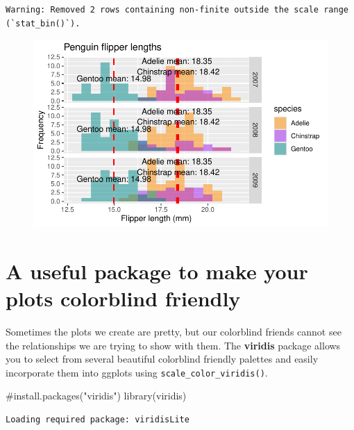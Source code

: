 \documentclass[
  letterpaper,
  DIV=11,
  numbers=noendperiod]{scrreprt}
\newenvironment{Shaded}{\begin{snugshade}}{\end{snugshade}}
\newcommand{\CommentTok}[1]{\textcolor[rgb]{0.37,0.37,0.37}{#1}}
\newcommand{\FunctionTok}[1]{\textcolor[rgb]{0.28,0.35,0.67}{#1}}
\newcommand{\NormalTok}[1]{\textcolor[rgb]{0.00,0.23,0.31}{#1}}
\begin{document}
\begin{verbatim}
Warning: Removed 2 rows containing non-finite outside the scale range
(`stat_bin()`).
\end{verbatim}

\begin{figure}[H]

{\centering \includegraphics{scripts/02_dataViz/class4_files/figure-pdf/facet_grid-3.pdf}

}

\end{figure}

\hypertarget{a-useful-package-to-make-your-plots-colorblind-friendly}{%
\section{A useful package to make your plots colorblind
friendly}\label{a-useful-package-to-make-your-plots-colorblind-friendly}}

Sometimes the plots we create are pretty, but our colorblind friends
cannot see the relationships we are trying to show with them. The
\textbf{viridis} package allows you to select from several beautiful
colorblind friendly palettes and easily incorporate them into ggplots
using \texttt{scale\_color\_viridis()}.

\begin{Shaded}
\begin{Highlighting}[]
\CommentTok{\#install.packages("viridis")}
\FunctionTok{library}\NormalTok{(viridis)}
\end{Highlighting}
\end{Shaded}

\begin{verbatim}
Loading required package: viridisLite
\end{verbatim}
\end{document}
